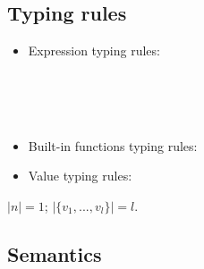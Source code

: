 \subsection{Typing rules}
\begin{itemize}
	
	\item Expression typing rules:\\
	
	
	\\[2ex]
	
	
	\\[2ex]
	
	\\[2ex]
	
	
\item  Built-in functions typing rules:\\

	
	\PT{\Axiom{\Typef{\iotan}{\int} {\tseq{\int}}}}
	\PT{\Axiom{\Typef{\plusn}{\int,\int} {\int}}}
	
	\item Value typing rules: \\
	
	
	
\end{itemize}

\begin{nota}
	 $|n| = 1$;
	 $|\{v_1,...,v_l\}| = l$.
\end{nota}

\subsection{Semantics}

